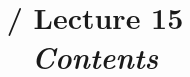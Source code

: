\renewcommand{\prevlecture}{14 }
\renewcommand{\thislecture}{15 }
\renewcommand{\nextlecture}{16 }

%
%

\title[\modulename / Lecture \thislecture]
{
  \modulename / Lecture \thislecture \\
  {\it Contents}\\
}



\begin{frame}[plain]
  \titlepage
\end{frame}


